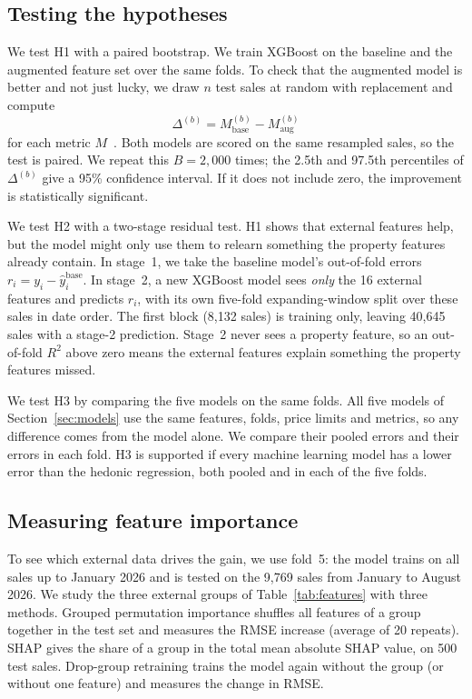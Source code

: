 \documentclass[conference]{IEEEtran}
\begin{document}
\subsection{Testing the hypotheses}\label{sec:tests}
We test H1 with a paired bootstrap. We train XGBoost on the baseline
and the augmented feature set over the same folds. To check that the
augmented
model is better and not just lucky, we draw $n$ test sales at random with
replacement and compute
\begin{equation}
  \Delta^{(b)} = M_{\text{base}}^{(b)} - M_{\text{aug}}^{(b)}
  \label{eq:bootstrap}
\end{equation}
for each metric $M$~\cite{efron1993}. Both models are scored on the same
resampled sales, so the test is paired. We repeat this $B=2{,}000$
times; the 2.5th and 97.5th percentiles of $\Delta^{(b)}$ give a 95\%
confidence interval. If it does not include zero, the improvement is
statistically significant.

We test H2 with a two-stage residual test. H1 shows that external
features help, but the model might only use them to relearn something
the property features already contain. In stage~1, we take the baseline
model's out-of-fold errors $r_i = y_i - \hat{y}_i^{\text{base}}$. In
stage~2, a new XGBoost model sees \emph{only} the 16 external features
and predicts $r_i$, with its own five-fold expanding-window split over
these sales in date order. The first block (8,132 sales) is training
only, leaving 40,645 sales with a stage-2 prediction. Stage~2 never sees
a property feature, so an out-of-fold $R^2$ above zero means the
external features explain something the property features missed.

We test H3 by comparing the five models on the same folds. All five
models of Section~\ref{sec:models} use the same features, folds, price
limits and metrics, so any difference comes from the model alone. We compare their
pooled errors and their errors in each fold. H3 is supported if every
machine learning model has a lower error than the hedonic regression,
both pooled and in each of the five folds.

\subsection{Measuring feature importance}\label{sec:attribution}
To see which external data drives the gain, we use fold~5: the model
trains on all sales up to January 2026 and is tested on the 9,769 sales
from January to August 2026. We study the three external groups of
Table~\ref{tab:features} with three methods. Grouped permutation
importance shuffles all features of a group together in the test set
and measures the RMSE increase (average of 20 repeats). SHAP gives the
share of a group in the total mean absolute SHAP value, on 500 test
sales. Drop-group retraining trains the model again without the group
(or without one feature) and measures the change in RMSE.
\end{document}
